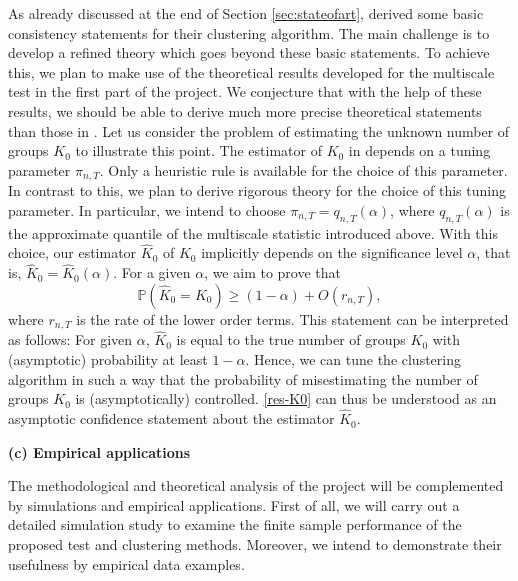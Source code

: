 \documentclass[a4paper,12pt]{article}
\begin{document}
As already discussed at the end of Section \ref{sec:stateofart}, \cite{VogtLinton2018} derived some basic consistency statements for their clustering algorithm. The main challenge is to develop a refined theory which goes beyond these basic statements. To achieve this, we plan to make use of the theoretical results developed for the multiscale test in the first part of the project. We conjecture that with the help of these results, we should be able to derive much more precise theoretical statements than those in \cite{VogtLinton2018}. Let us consider the problem of estimating the unknown number of groups $K_0$ to illustrate this point. The estimator of $K_0$ in \cite{VogtLinton2018} depends on a tuning parameter $\pi_{n,T}$. Only a heuristic rule is available for the choice of this parameter. In contrast to this, we plan to derive rigorous theory for the choice of this tuning parameter. In particular, we intend to choose $\pi_{n,T} = q_{n,T}(\alpha)$, where $q_{n,T}(\alpha)$ is the approximate quantile of the multiscale statistic introduced above. With this choice, our estimator $\hat{K}_0$ of $K_0$ implicitly depends on the significance level $\alpha$, that is, $\hat{K}_0 = \hat{K}_0(\alpha)$. For a given $\alpha$, we aim to prove that  
\begin{equation}\label{res-K0}
\mathbb{P}( \hat{K}_0 = K_0 ) \ge (1-\alpha) + O(r_{n,T}), 
\end{equation}
where $r_{n,T}$ is the rate of the lower order terms. This statement can be interpreted as follows: For given $\alpha$, $\hat{K}_0$ is equal to the true number of groups $K_0$ with (asymptotic) probability at least $1-\alpha$. Hence, we can tune the clustering algorithm in such a way that the probability of misestimating the number of groups $K_0$ is (asymptotically) controlled. \eqref{res-K0} can thus be understood as an asymptotic confidence statement about the estimator $\hat{K}_0$. 
\vspace{15pt}


\noindent \textbf{(c) Empirical applications} 
\vspace{10pt}


\noindent The methodological and theoretical analysis of the project will be complemented by simulations and empirical applications. First of all, we will carry out a detailed simulation study to examine the finite sample performance of the proposed test and clustering methods. Moreover, we intend to demonstrate their usefulness by empirical data examples. 
\end{document}

